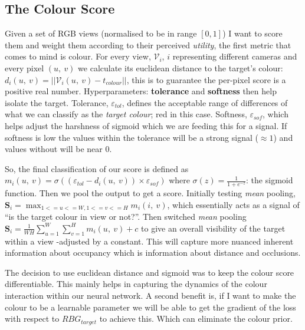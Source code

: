 \subsection{The Colour Score}
Given a set of RGB views (normalised to be  in range \(\left[0, 1\right]\)) I want to score them and weight them according to their perceived \emph{utility}, the first metric that comes to mind is colour. For every view, $\mathcal{V}_i$, $i$ representing different cameras and every pixel $\left( u, ~v\right)$ we calculate its euclidean distance to the target's colour: \( d_i\left(u, ~v\right) = ||\mathcal{V}_i\left(u, ~v\right) - t_{colour}||\), this is to guarantee the per-pixel score is a positive real number. Hyperparameters: \textbf{tolerance} and \textbf{softness} then help isolate the target. Tolerance, $\varepsilon_{tol}$, defines the acceptable range of differences of what we can classify as the \emph{target colour}; red in this case. Softness, $\varepsilon_{sof}$, which helps adjust the harshness of sigmoid which we are feeding this for a signal. If softness is low the values within the tolerance will be a strong signal ($\approx 1$) and values without will be near $0$. 

So, the final classification of our score is defined as \(m_i\left(u, ~v\right) = \sigma \left(\left(\varepsilon_{tol} - d_i\left(u, ~v\right)\right)\times \varepsilon_{sof} \right)\) where \(\sigma\left(z\right) = \frac{1}{1 + e^{-z}}\): the sigmoid function. 
Then we pool the output to get a score. Initially testing \emph{mean} pooling, \(\mathbf{S}_i = \max_{1<=u<=W, 1<=v<=H}m_i(i, ~v)\), which essentially acts as a signal of ``is the target colour in view or not?''. Then switched \emph{mean} pooling \(\mathbf{S}_i = {\frac{1}{WH}\sum_{u = 1}^{W}\sum_{v = 1}^{H}m_i\left(u, ~v\right)} + c\) to give an overall visibility of the target within a view -adjusted by a constant. This will capture more nuanced inherent information about occupancy which is information about distance and occlusions.

The decision to use euclidean distance and sigmoid was to keep the colour score differentiable. This mainly helps in capturing the dynamics of the colour interaction within our neural network. A second benefit is, if I want to make the colour to be a learnable parameter we will be able to get the gradient of the loss with respect to ${RBG}_{target}$ to achieve this. Which can eliminate the colour prior.

